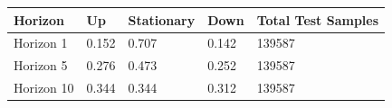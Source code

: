 \begin{tabular}{lllll}
\toprule
Horizon & Up & Stationary & Down & Total Test Samples \\
\midrule
Horizon 1 & 0.152 & 0.707 & 0.142 & 139587 \\
Horizon 5 & 0.276 & 0.473 & 0.252 & 139587 \\
Horizon 10 & 0.344 & 0.344 & 0.312 & 139587 \\
\bottomrule
\end{tabular}
